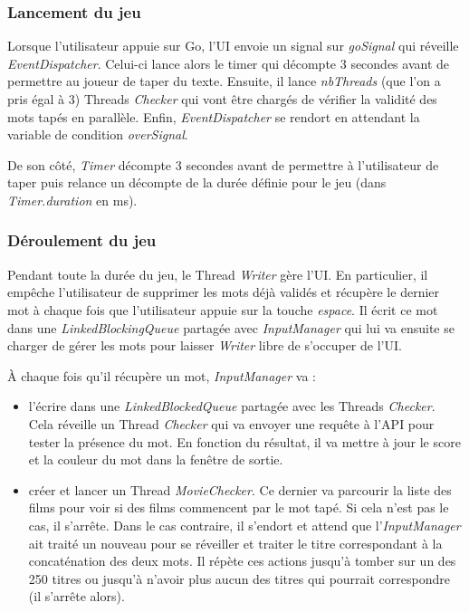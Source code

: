 \documentclass[a4paper,11pt]{article}
\begin{document}
\subsubsection{Lancement du jeu}
Lorsque l'utilisateur appuie sur Go, l'UI envoie un signal sur \textit{goSignal} qui réveille \textit{EventDispatcher}. Celui-ci lance alors le timer qui décompte 3 secondes avant de permettre au joueur de taper du texte. Ensuite, il lance \textit{nbThreads} (que l'on a pris égal à 3) Threads \textit{Checker} qui vont être chargés de vérifier la validité des mots tapés en parallèle. Enfin, \textit{EventDispatcher} se rendort en attendant la variable de condition \textit{overSignal}.\par
De son côté, \textit{Timer} décompte 3 secondes avant de permettre à l'utilisateur de taper puis relance un décompte de la durée définie pour le jeu (dans \textit{Timer.duration} en ms).\par
\subsubsection{Déroulement du jeu} 
Pendant toute la durée du jeu, le Thread \textit{Writer} gère l'UI. En particulier, il empêche l'utilisateur de supprimer les mots déjà validés et récupère le dernier mot à chaque fois que l'utilisateur appuie sur la touche \textit{espace}. Il écrit ce mot dans une \textit{LinkedBlockingQueue} partagée avec \textit{InputManager} qui lui va ensuite se charger de gérer les mots pour laisser \textit{Writer} libre de s'occuper de l'UI.\par
À chaque fois qu'il récupère un mot, \textit{InputManager} va :
\begin{itemize}
\item l'écrire dans une \textit{LinkedBlockedQueue} partagée avec les Threads \textit{Checker}. Cela réveille un Thread \textit{Checker} qui va envoyer une requête à l'API pour tester la présence du mot. En fonction du résultat, il va mettre à jour le score et la couleur du mot dans la fenêtre de sortie.
\item créer et lancer un Thread \textit{MovieChecker}. Ce dernier va parcourir la liste des films pour voir si des films commencent par le mot tapé. Si cela n'est pas le cas, il s'arrête. Dans le cas contraire, il s'endort et attend que l'\textit{InputManager} ait traité un nouveau pour se réveiller et traiter le titre correspondant à la concaténation des deux mots. Il répète ces actions jusqu'à tomber sur un des 250 titres ou jusqu'à n'avoir plus aucun des titres qui pourrait correspondre (il s'arrête alors).
\end{itemize}
\end{document}
